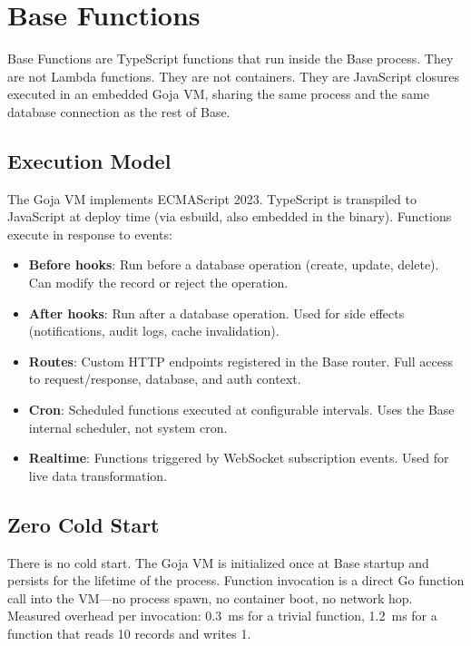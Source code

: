 \documentclass[11pt]{article}
\begin{document}
\section{Base Functions}
\label{sec:functions}

Base Functions are TypeScript functions that run inside the Base process. They
are not Lambda functions. They are not containers. They are JavaScript closures
executed in an embedded Goja VM, sharing the same process and the same database
connection as the rest of Base.

\subsection{Execution Model}

The Goja VM implements ECMAScript 2023. TypeScript is transpiled to JavaScript
at deploy time (via esbuild, also embedded in the binary). Functions execute
in response to events:

\begin{itemize}[leftmargin=1.1em]
    \item \textbf{Before hooks}: Run before a database operation (create, update,
    delete). Can modify the record or reject the operation.
    \item \textbf{After hooks}: Run after a database operation. Used for
    side effects (notifications, audit logs, cache invalidation).
    \item \textbf{Routes}: Custom HTTP endpoints registered in the Base router.
    Full access to request/response, database, and auth context.
    \item \textbf{Cron}: Scheduled functions executed at configurable intervals.
    Uses the Base internal scheduler, not system cron.
    \item \textbf{Realtime}: Functions triggered by WebSocket subscription
    events. Used for live data transformation.
\end{itemize}

\subsection{Zero Cold Start}

There is no cold start. The Goja VM is initialized once at Base startup and
persists for the lifetime of the process. Function invocation is a direct
Go function call into the VM---no process spawn, no container boot, no
network hop. Measured overhead per invocation: 0.3~ms for a trivial function,
1.2~ms for a function that reads 10 records and writes 1.
\end{document}
